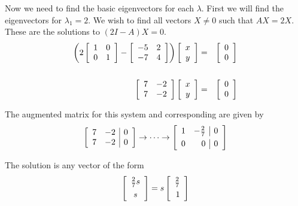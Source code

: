 \begin{solution}
Now we need to find the basic eigenvectors for each $\lambda$. First we will find the eigenvectors for $\lambda_1 = 2$. We wish to find all vectors $X \neq 0$ such that $AX = 2X$. These are the solutions to $(2I - A)X = 0$. 
\begin{eqnarray*}
\left( 
2 \left[ \begin{array}{rr}
1 & 0 \\
0 & 1 
\end{array}\right] - 
\left[ \begin{array}{rr}
-5 & 2 \\
-7 & 4
\end{array}\right]
 \right) \left[ \begin{array}{c}
x \\
y 
\end{array}\right] &=& \left[ \begin{array}{r}
0 \\
0
\end{array} \right] \\
\\
\left[ \begin{array}{rr}
7 & -2 \\
7 & -2
\end{array}\right] \left[ \begin{array}{c}
x \\
y 
\end{array}\right] &=& \left[ \begin{array}{r}
0 \\
0
\end{array} \right] 
\end{eqnarray*}

The augmented matrix for this system and corresponding {\rref} are given by 
\[
\leftB \begin{array}{rr|r}
7 & -2 & 0 \\
7 & -2 & 0
\end{array}\rightB 
\rightarrow \cdots \rightarrow 
\leftB \begin{array}{rr|r}
1 & -\vspace{0.05in}\frac{2}{7} & 0 \\
0 & 0 & 0 
\end{array} \rightB 
\]

The solution is any vector of the form
\[
\leftB \begin{array}{c}
\vspace{0.05in}\frac{2}{7}s \\
s
\end{array} \rightB
=
s
\leftB \begin{array}{r}
\vspace{0.05in}\frac{2}{7} \\
1
\end{array} \rightB
\]


\end{solution}
